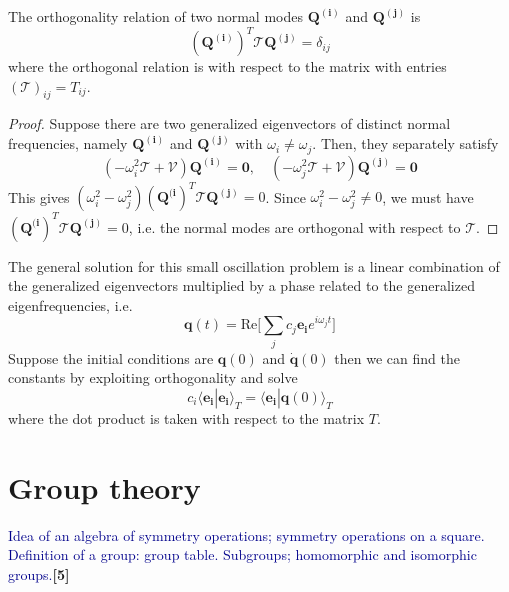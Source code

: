 \documentclass[a4paper]{article}
\begin{document}
\begin{prop}
The orthogonality relation of two normal modes $\mathbf{Q^{(i)}}$ and $\mathbf{Q^{(j)}}$ is 
$$(\mathbf{Q^{(i)}})^T\mathcal{T}\mathbf{Q^{(j)}}=\delta_{ij}$$
where the orthogonal relation is with respect to the matrix with entries $(\mathcal{T})_{ij}=T_{ij}$.
\end{prop}
\begin{proof}
 Suppose there are two generalized eigenvectors of distinct normal frequencies, namely $\mathbf{Q^{(i)}}$ and $\mathbf{Q^{(j)}}$ with $\omega_i\neq\omega_j$. Then, they separately satisfy
$$(-\omega_i^2\mathcal{T}+\mathcal{V})\mathbf{Q^{(i)}}=\boldsymbol{0},\quad(-\omega_j^2\mathcal{T}+\mathcal{V})\mathbf{Q^{(j)}}=\boldsymbol{0}$$
This gives $(\omega_i^2-\omega_j^2)(\mathbf{Q^{(i}})^T\mathcal{T}\mathbf{Q^{(j)}}=0$. Since $\omega_i^2-\omega_j^2\neq 0$, we must have $(\mathbf{Q^{(i}})^T\mathcal{T}\mathbf{Q^{(j)}}=0$, i.e. the normal modes are orthogonal with respect to $\mathcal{T}$.
\end{proof}
\begin{remarks}
The general solution for this small oscillation problem is a linear combination of the generalized eigenvectors multiplied by a phase related to the generalized eigenfrequencies, i.e.
$$\mathbf{q}(t)=\text{Re}\bigg[\sum_jc_j\mathbf{e_i}e^{i\omega_jt}\bigg]$$
Suppose the initial conditions are $\mathbf{q}(0)$ and $\mathbf{\dot{q}}(0)$ then we can find the constants by exploiting orthogonality and solve
$$c_i\langle\mathbf{e_i}|\mathbf{e_i}\rangle_T=\langle\mathbf{e_i}|\mathbf{q}(0)\rangle_T$$
where the dot product is taken with respect to the matrix $T$.
\end{remarks}
\newpage
\section{Group theory}
{\small\textcolor{darkblue}{Idea of an algebra of symmetry operations; symmetry operations on a square. Definition of a group: group table. Subgroups; homomorphic and isomorphic groups.}\hfill\textbf{[5]}}
\end{document}
